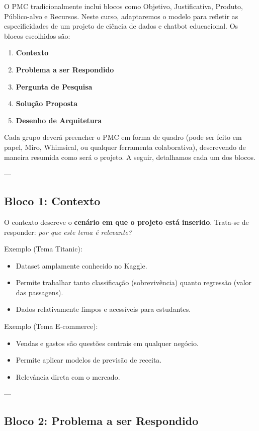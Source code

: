 \documentclass[12pt,a4paper]{article}
\begin{document}
O PMC tradicionalmente inclui blocos como Objetivo, Justificativa, Produto, Público-alvo e Recursos. Neste curso, adaptaremos o modelo para refletir as especificidades de um projeto de ciência de dados e chatbot educacional. Os blocos escolhidos são:

\begin{enumerate}
  \item \textbf{Contexto}
  \item \textbf{Problema a ser Respondido}
  \item \textbf{Pergunta de Pesquisa}
  \item \textbf{Solução Proposta}
  \item \textbf{Desenho de Arquitetura}
\end{enumerate}

Cada grupo deverá preencher o PMC em forma de quadro (pode ser feito em papel, Miro, Whimsical, ou qualquer ferramenta colaborativa), descrevendo de maneira resumida como será o projeto. A seguir, detalhamos cada um dos blocos.

---

\subsection{Bloco 1: Contexto}

O contexto descreve o \textbf{cenário em que o projeto está inserido}. Trata-se de responder: 
\textit{por que este tema é relevante?}

Exemplo (Tema Titanic):
\begin{itemize}
  \item Dataset amplamente conhecido no Kaggle.
  \item Permite trabalhar tanto classificação (sobrevivência) quanto regressão (valor das passagens).
  \item Dados relativamente limpos e acessíveis para estudantes.
\end{itemize}

Exemplo (Tema E-commerce):
\begin{itemize}
  \item Vendas e gastos são questões centrais em qualquer negócio.
  \item Permite aplicar modelos de previsão de receita.
  \item Relevância direta com o mercado.
\end{itemize}

---

\subsection{Bloco 2: Problema a ser Respondido}
\end{document}
